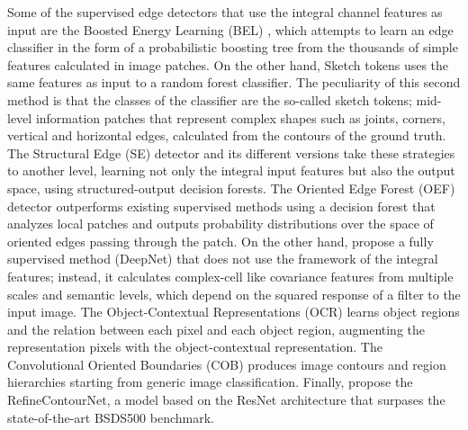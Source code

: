 Some of the supervised edge detectors that use the integral channel features as input are the Boosted Energy Learning (BEL) \citep{Dollar.ZhuowenTu.ea:CVPR:2006}, which attempts to learn an edge classifier in the form of a probabilistic boosting tree from the thousands of simple features calculated in image patches. On the other hand, Sketch tokens \citep{Lim.Zitnick.ea:CVPR:2013} uses the same features as input to a random forest classifier. The peculiarity of this second method is that the classes of the classifier are the so-called sketch tokens; mid-level information patches that represent complex shapes such as joints, corners, vertical and horizontal edges, calculated from the contours of the ground truth. The Structural Edge (SE) detector \citep{Dollar.Zitnick:ICCV:2013} and its different versions \citep{Dollar.Zitnick:PAMI:2015} take these strategies to another level, learning not only the integral input features but also the output space, using structured-output decision forests. The Oriented Edge Forest (OEF) detector \citep{Hallman.Fowlkes:CVPR:2015} outperforms existing supervised methods using a decision forest that analyzes local patches and outputs probability distributions over the space of oriented edges passing through the patch. On the other hand, \cite{Kivinen.Williams.ea:PMLR:2014} propose a fully supervised method (DeepNet) that does not use the framework of the integral features; instead, it calculates complex-cell like covariance features from multiple scales and semantic levels, which depend on the squared response of a filter to the input image. The Object-Contextual Representations (OCR) \citep{Yuan.Chen.ea:arXiv:2021} learns object regions and the relation between each pixel and each object region, augmenting the representation pixels with the object-contextual representation. The Convolutional Oriented Boundaries (COB) \citep{Maninis.Pont-Tuset.ea:PAMI:2018} produces image contours and region hierarchies starting from generic image classification. Finally, \cite{Kelm.Rao.ea:CAIP:2019} propose the RefineContourNet, a model based on the ResNet architecture that surpases the state-of-the-art BSDS500 benchmark. 

